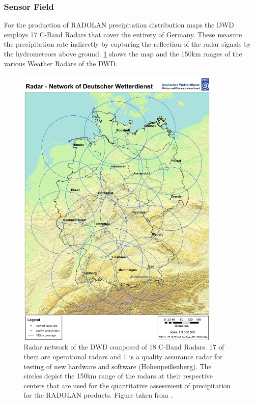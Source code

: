 \subsubsection{Sensor Field}
For the production of RADOLAN precipitation distribution maps the DWD employs 17 C-Band Radars that cover the entirety of Germany. These measure the precipitation rate indirectly by capturing the reflection of the radar signals by the hydrometeors above ground. \cref{fig:dwdradar} shows the map and the 150km ranges of the various Weather Radars of the DWD. 

\begin{figure}[h!]
    \centering
    \includegraphics[width=0.9\textwidth]{DWD_RADAR.jpeg}
    \caption{Radar network of the DWD composed of 18 C-Band Radars. 17 of them are operational radars and 1 is a quality assurance radar for testing of new hardware and software (Hohenpeißenberg). The circles depict the 150km range of the radars at their respective centers that are used for the quantitative assessment of precipitation for the RADOLAN products. Figure taken from \citet{DeutscherWetterdienst2022WebsiteDWD}.}
    \label{fig:dwdradar}
\end{figure}

